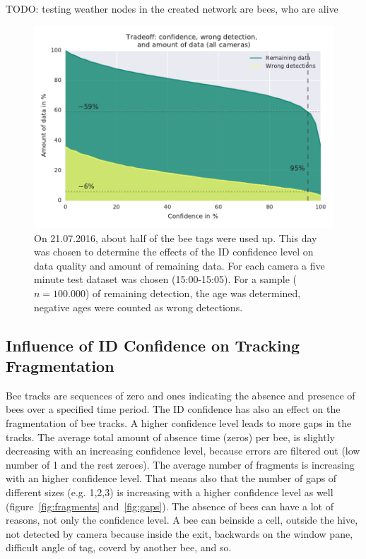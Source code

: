 TODO: testing weather nodes in the created network are bees, who are alive\\

\begin{figure}[htb]
	\centering
	\includegraphics[width=1.0\textwidth]{Figures/tradeoff}
	\caption[Tradeoff: Confidence level, data quality and amount of data]{On 21.07.2016, about half of the bee tags were used up. This day was chosen to determine the effects of the ID confidence level on data quality and amount of remaining data. For each camera a five minute test dataset was chosen (15:00-15:05). For a sample ($n= 100.000$) of remaining detection, the age was determined, negative ages were counted as wrong detections.}
	\label{fig:tradeoff}
\end{figure}

\subsection{Influence of ID Confidence on Tracking Fragmentation}
\label{subsec:tracking}

Bee tracks are sequences of zero and ones indicating the absence and presence of bees over a specified time period. The ID confidence has also an effect on the fragmentation of bee tracks. A higher confidence level leads to more gaps in the tracks. 
The average total amount of absence time (zeros) per bee, is slightly decreasing with an increasing confidence level, because errors are filtered out (low number of 1 and the rest zeroes). The average number of fragments is increasing with an higher confidence level. That means also that the number of gaps of different sizes (e.g. 1,2,3) is increasing with a higher confidence level as well (figure~\ref{fig:fragments} and~\ref{fig:gaps}).
The absence of bees can have a lot of reasons, not only the confidence level. A bee can beinside a cell, outside the hive, not detected by camera because inside the exit, backwards on the window pane, difficult angle of tag, coverd by another bee, and so.

